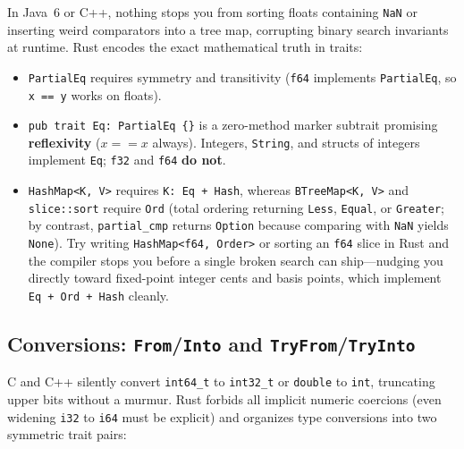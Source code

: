 In Java~6 or C++, nothing stops you from sorting floats containing \texttt{NaN} or inserting weird comparators into a tree map, corrupting binary search invariants at runtime. Rust encodes the exact mathematical truth in traits:
\begin{itemize}
  \item \texttt{PartialEq} requires symmetry and transitivity (\texttt{f64} implements \texttt{PartialEq}, so \texttt{x == y} works on floats).
  \item \texttt{pub trait Eq: PartialEq \{\}} is a zero-method marker subtrait promising \textbf{reflexivity} ($x == x$ always). Integers, \texttt{String}, and structs of integers implement \texttt{Eq}; \texttt{f32} and \texttt{f64} \textbf{do not}.
  \item \texttt{HashMap<K, V>} requires \texttt{K: Eq + Hash}, whereas \texttt{BTreeMap<K, V>} and \texttt{slice::sort} require \texttt{Ord} (total ordering returning \texttt{Less}, \texttt{Equal}, or \texttt{Greater}; by contrast, \texttt{partial\_cmp} returns \texttt{Option} because comparing with \texttt{NaN} yields \texttt{None}). Try writing \texttt{HashMap<f64, Order>} or sorting an \texttt{f64} slice in Rust and the compiler stops you before a single broken search can ship---nudging you directly toward fixed-point integer cents and basis points, which implement \texttt{Eq + Ord + Hash} cleanly.
\end{itemize}

\subsection{Conversions: \texttt{From}/\texttt{Into} and \texttt{TryFrom}/\texttt{TryInto}}

C and C++ silently convert \texttt{int64\_t} to \texttt{int32\_t} or \texttt{double} to \texttt{int}, truncating upper bits without a murmur. Rust forbids all implicit numeric coercions (even widening \texttt{i32} to \texttt{i64} must be explicit) and organizes type conversions into two symmetric trait pairs:

